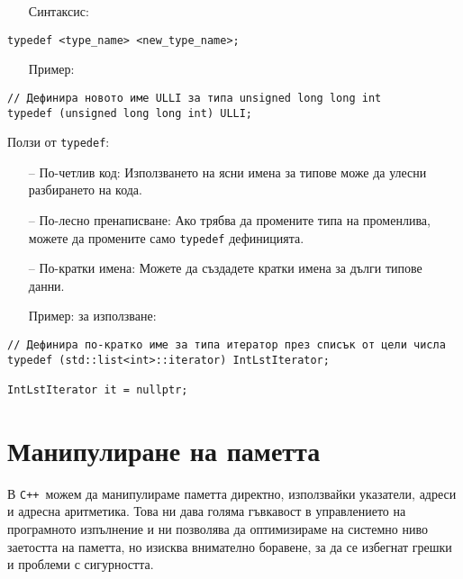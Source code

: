\documentclass[oneside]{book}
\newcommand*{\code}[1]{\texttt{#1}}
\newcommand*{\cpp}{\texttt{C++}\ }
\begin{document}
\begin{itemize}\item[Синтаксис:]\end{itemize}
\begin{mdframed}\begin{lstlisting}
typedef <type_name> <new_type_name>;
\end{lstlisting}\end{mdframed}

\begin{itemize}\item[Пример:]\end{itemize}
\begin{mdframed}\begin{lstlisting}
// Дефинира новото име ULLI за типа unsigned long long int
typedef (unsigned long long int) ULLI;
\end{lstlisting}\end{mdframed}
\pagebreak
Ползи от \code{typedef}:
\begin{itemize}
    \item[--] По-четлив код: Използването на ясни имена за типове може да улесни разбирането на кода.
    \item[--] По-лесно пренаписване: Ако трябва да промените типа на променлива, можете да промените само \code{typedef} дефиницията.
    \item[--] По-кратки имена: Можете да създадете кратки имена за дълги типове данни.
\end{itemize}

\begin{itemize}\item[Пример:] за използване:\end{itemize}
\begin{mdframed}\begin{lstlisting}
// Дефинира по-кратко име за типа итератор през списък от цели числа
typedef (std::list<int>::iterator) IntLstIterator;

IntLstIterator it = nullptr;
\end{lstlisting}\end{mdframed}

\chapter{Манипулиране на паметта}
В \cpp можем да манипулираме паметта директно, използвайки указатели, адреси и адресна аритметика. Това ни дава голяма гъвкавост в управлението на програмното изпълнение и ни позволява да оптимизираме на системно ниво заетостта на паметта, но изисква внимателно боравене, за да се избегнат грешки и проблеми с сигурността.
\end{document}
